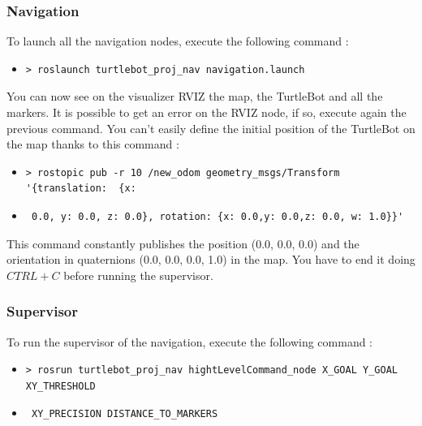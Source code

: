 \documentclass[10pt,a4paper]{article}
\begin{document}
\subsubsection{Navigation}
\label{sec:navigation}

To launch all the navigation nodes, execute the following command :

\begin{itemize}
\item[]  \begin{verbatim}> roslaunch turtlebot_proj_nav navigation.launch \end{verbatim}
\end{itemize}

You can now see on the visualizer RVIZ the map, the TurtleBot and all the markers. It is possible to get an error on the RVIZ node, if so, execute again the previous command. You can't easily define the initial position of the TurtleBot on the map thanks to this command :

\begin{itemize}
\item[]  \begin{verbatim}> rostopic pub -r 10 /new_odom geometry_msgs/Transform '{translation:  {x: \end{verbatim}
\item[]  \begin{verbatim} 0.0, y: 0.0, z: 0.0}, rotation: {x: 0.0,y: 0.0,z: 0.0, w: 1.0}}' \end{verbatim}
\end{itemize}

This command constantly publishes the position (0.0, 0.0, 0.0) and the orientation in quaternions (0.0, 0.0, 0.0, 1.0) in the map. You have to end it doing $CTRL+C$ before running the supervisor.

\subsubsection{Supervisor}
\label{sec:supervisor}

To run the supervisor of the navigation, execute the following command :

\begin{itemize}
\item[]  \begin{verbatim}> rosrun turtlebot_proj_nav hightLevelCommand_node X_GOAL Y_GOAL XY_THRESHOLD  \end{verbatim}
\item[]  \begin{verbatim} XY_PRECISION DISTANCE_TO_MARKERS \end{verbatim}
\end{itemize}
\end{document}
